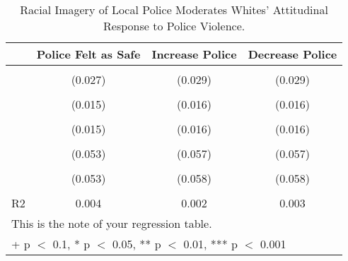 \documentclass[
  11pt,
]{article}
\begin{document}
\hypertarget{tbl-racial.component}{}
\begin{table}
\caption{\label{tbl-racial.component}Racial Imagery of Local Police Moderates Whites' Attitudinal Response to
Police Violence. }\tabularnewline

\centering
\begin{tabular}[t]{lccc}
\toprule
  & Police Felt as Safe & Increase Police & Decrease Police\\
\midrule
\cellcolor{gray!6}{White Imagery of Police} & \cellcolor{gray!6}{0.007} & \cellcolor{gray!6}{-0.013} & \cellcolor{gray!6}{-0.010}\\
 & (0.027) & (0.029) & (0.029)\\
\cellcolor{gray!6}{PV Whites} & \cellcolor{gray!6}{-0.065***} & \cellcolor{gray!6}{-0.039*} & \cellcolor{gray!6}{0.056***}\\
 & (0.015) & (0.016) & \vphantom{1} (0.016)\\
\cellcolor{gray!6}{PV POC} & \cellcolor{gray!6}{-0.076***} & \cellcolor{gray!6}{-0.077***} & \cellcolor{gray!6}{0.093***}\\
 & (0.015) & (0.016) & (0.016)\\
\cellcolor{gray!6}{White Imagery × PV Whites} & \cellcolor{gray!6}{0.098+} & \cellcolor{gray!6}{-0.003} & \cellcolor{gray!6}{-0.075}\\
 & (0.053) & (0.057) & (0.057)\\
\cellcolor{gray!6}{White Imagery × PV POC} & \cellcolor{gray!6}{0.164**} & \cellcolor{gray!6}{0.162**} & \cellcolor{gray!6}{-0.210***}\\
 & (0.053) & (0.058) & (0.058)\\
\midrule
\cellcolor{gray!6}{Num.Obs.} & \cellcolor{gray!6}{26016} & \cellcolor{gray!6}{26039} & \cellcolor{gray!6}{26036}\\
R2 & 0.004 & 0.002 & 0.003\\
\bottomrule
\multicolumn{4}{l}{\rule{0pt}{1em}This is the note of your regression table.}\\
\multicolumn{4}{l}{\rule{0pt}{1em}+ p $<$ 0.1, * p $<$ 0.05, ** p $<$ 0.01, *** p $<$ 0.001}\\
\end{tabular}
\end{table}


\printbibliography[title=References]
\end{document}
